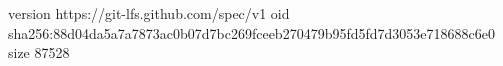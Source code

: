 version https://git-lfs.github.com/spec/v1
oid sha256:88d04da5a7a7873ac0b07d7bc269fceeb270479b95fd5fd7d3053e718688c6e0
size 87528
